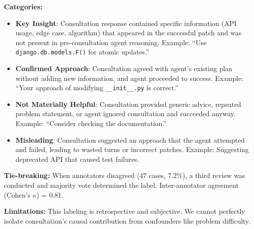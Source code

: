 \documentclass[11pt,a4paper]{article}
\begin{document}
\textbf{Categories:}
\begin{itemize}
    \item \textbf{Key Insight}: Consultation response contained specific information (API usage, edge case, algorithm) that appeared in the successful patch and was not present in pre-consultation agent reasoning. Example: ``Use \texttt{django.db.models.F()} for atomic updates.''
    
    \item \textbf{Confirmed Approach}: Consultation agreed with agent's existing plan without adding new information, and agent proceeded to success. Example: ``Your approach of modifying \texttt{\_\_init\_\_.py} is correct.''
    
    \item \textbf{Not Materially Helpful}: Consultation provided generic advice, repeated problem statement, or agent ignored consultation and succeeded anyway. Example: ``Consider checking the documentation.''
    
    \item \textbf{Misleading}: Consultation suggested an approach that the agent attempted and failed, leading to wasted turns or incorrect patches. Example: Suggesting deprecated API that caused test failures.
\end{itemize}

\textbf{Tie-breaking:} When annotators disagreed (47 cases, 7.2\%), a third review was conducted and majority vote determined the label. Inter-annotator agreement (Cohen's $\kappa$) = 0.81.

\textbf{Limitations:} This labeling is retrospective and subjective. We cannot perfectly isolate consultation's causal contribution from confounders like problem difficulty.


\end{document}
